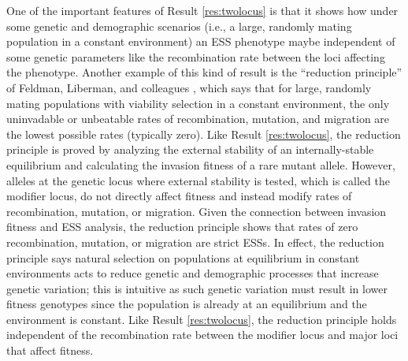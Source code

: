 \documentclass[11pt]{article}
\begin{document}
\begin{figure}[t!]
  \label{fig:pip:switching}
\end{figure}

One of the important features of Result \ref{res:twolocus} is that it shows how under some genetic and demographic scenarios (i.e., a large, randomly mating population in a constant environment) an ESS phenotype maybe independent of some genetic parameters like the recombination rate between the loci affecting the phenotype. Another example of this kind of result is the ``reduction principle'' of Feldman, Liberman, and colleagues \cite{Feldman:Liberman:1986,Liberman:Feldman:1986,Liberman:Feldman:1986a,Liberman:Feldman:1989,Altenberg:Liberman:2017}, which says that for large, randomly mating populations with viability selection in a constant environment, the only uninvadable or unbeatable rates of recombination, mutation, and migration are the lowest possible rates (typically zero). Like Result \ref{res:twolocus}, the reduction principle is proved by analyzing the external stability of an internally-stable equilibrium and calculating the invasion fitness of a rare mutant allele. However, alleles at the genetic locus where external stability is tested, which is called the modifier locus, do not directly affect fitness and instead modify rates of recombination, mutation, or migration. Given the connection between invasion fitness and ESS analysis, the reduction principle shows that rates of zero recombination, mutation, or migration are strict ESSs. In effect, the reduction principle says natural selection on populations at equilibrium in constant environments acts to reduce genetic and demographic processes that increase genetic variation; this is intuitive as such genetic variation must result in lower fitness genotypes since the population is already at an equilibrium and the environment is constant. Like Result \ref{res:twolocus}, the reduction principle holds independent of the recombination rate between the modifier locus and major loci that affect fitness.
\end{document}
